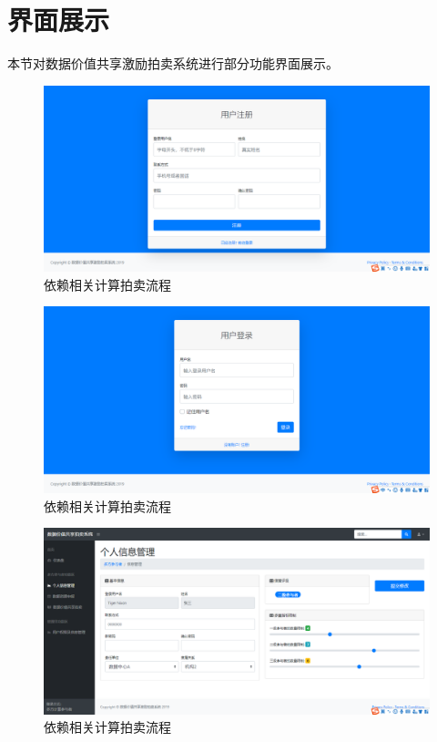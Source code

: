 \documentclass[promaster]{thesis-uestc}
\begin{document}
\section{界面展示}
本节对数据价值共享激励拍卖系统进行部分功能界面展示。
\begin{figure}[H]
    \includegraphics[width=400pt]{ui/register.png}
    \caption{依赖相关计算拍卖流程}
\end{figure}
\begin{figure}[H]
    \includegraphics[width=400pt]{ui/login.png}
    \caption{依赖相关计算拍卖流程}
\end{figure}
\begin{figure}[H]
    \includegraphics[width=400pt]{ui/gerenxinxiguanli.png}
    \caption{依赖相关计算拍卖流程}
\end{figure}
\end{document}

